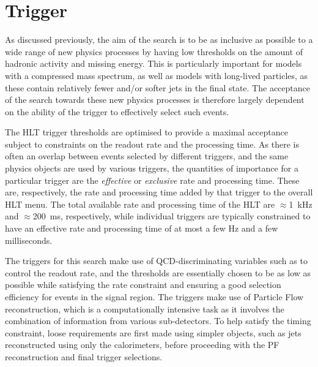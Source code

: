 

\section{Trigger}
\label{sec:analysis-trigger}

As discussed previously, %
the aim of the search is to be as inclusive as possible to a wide range of new 
physics processes by having low thresholds on the amount of hadronic activity 
and missing energy. This is particularly important for models with a compressed 
mass spectrum, as well as models with long-lived particles, as these contain 
relatively fewer and/or softer jets in the final state. The acceptance of the 
search towards these new physics processes is therefore largely dependent on 
the ability of the trigger to effectively select such events. 

The HLT trigger thresholds are optimised to provide a maximal acceptance 
subject to 
constraints on the readout rate and the processing time. As there is often an 
overlap between events selected by different triggers, and the same physics 
objects are used by various triggers, the quantities of importance for a 
particular trigger are the \textit{effective} or \textit{exclusive} rate and 
processing time. These 
are, respectively, the rate and processing time added by that trigger to the 
overall HLT menu. The total available rate and processing time of the HLT are 
$\approx$1~kHz and $\approx$200~ms, respectively, while individual triggers are 
typically constrained to have an effective rate and processing time of at most 
a few Hz and a few milliseconds.

The triggers for this search make use of QCD-discriminating variables such as 
\alphat to control the readout rate, and the thresholds are essentially chosen 
to be as low as possible while satisfying the rate constraint and ensuring a 
good selection efficiency for events in the signal region.
The triggers make use of Particle Flow reconstruction, which is a 
computationally intensive task as it involves the combination of information 
from various sub-detectors. To help satisfy the timing constraint, loose 
requirements are first made using simpler objects, such as jets reconstructed 
using only the calorimeters, before proceeding with the PF reconstruction and 
final trigger selections.

